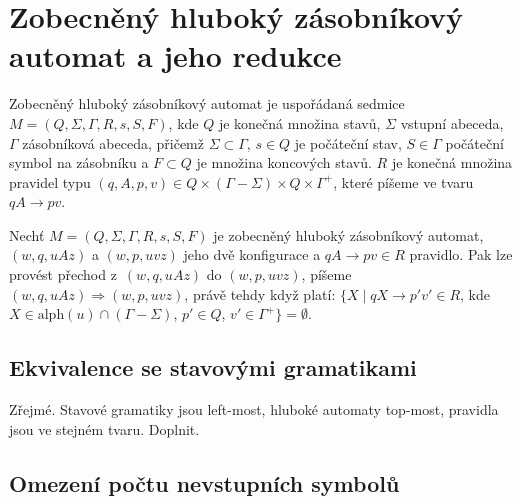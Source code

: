
\chapter{Zobecněný hluboký zásobníkový automat a jeho redukce}


\begin{Def}
Zobecněný hluboký zásobníkový automat je uspořádaná sedmice $M = (Q,\Sigma,\Gamma, R, s, S, F)$, 
kde $Q$ je konečná množina stavů, $\Sigma$ vstupní abeceda, $\Gamma$ zásobníková abeceda, přičemž $\Sigma \subset \Gamma$,
$s \in Q$ je počáteční stav, $S \in \Gamma$ počáteční symbol na zásobníku a $F \subset Q$ je množina
koncových stavů. $R$ je konečná množina pravidel typu $(q, A, p, v) \in Q \times (\Gamma - \Sigma) \times Q \times {\Gamma}^+$, které píšeme ve tvaru $qA \rightarrow pv$. 
\end{Def}

\begin{Def}
Nechť $M = (Q,\Sigma,\Gamma, R, s, S, F)$ je zobecněný hluboký zásobníkový automat, $(w,q,uAz)$ a $(w,p,uvz)$ jeho dvě konfigurace a $qA \rightarrow pv \in R$ pravidlo. Pak lze provést přechod z~$(w,q,uAz)$ do $(w,p,uvz)$, píšeme $(w,q,uAz) {\Rightarrow} (w,p,uvz)$, právě tehdy když platí: $\{X \mid qX \rightarrow p'v' \in R$, kde $X \in \mathrm{alph}(u) \cap (\Gamma - \Sigma)$, $p' \in Q$, $v' \in {\Gamma}^+ \} = \emptyset$.
\end{Def}

 \section{Ekvivalence se stavovými gramatikami} \label{sec_ekv_state_grammars}


Zřejmé. Stavové gramatiky jsou left-most, hluboké automaty top-most, pravidla jsou ve stejném tvaru. Doplnit.

\section{Omezení počtu nevstupních symbolů}


